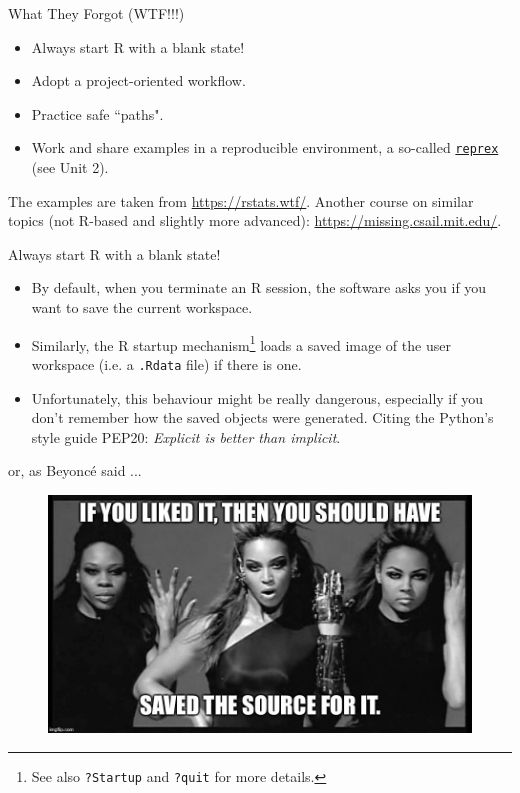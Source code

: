 \documentclass[
hyperref={bookmarks=false},
xcolor={dvipsnames,svgnames*,x11names*}, 
12pt
]{beamer}
\begin{document}
\begin{frame}{What They Forgot (WTF!!!)}
\vspace{-0.75cm}
\begin{itemize}
\itemsep 2ex
\item Always start R with a blank state!
\item Adopt a project-oriented workflow. 
\item Practice safe ``paths". 
\item Work and share examples in a reproducible environment, a so-called \href{https://reprex.tidyverse.org/}{\texttt{reprex}} (see Unit 2). 	
\end{itemize}

\vspace{0.5cm}

The examples are taken from \url{https://rstats.wtf/}. Another course on similar topics (not R-based and slightly more advanced): \url{https://missing.csail.mit.edu/}. 
\end{frame}

\begin{frame}{Always start R with a blank state!}
\vspace{-0.5cm}
\begin{itemize}
\itemsep 3ex
\item By default, when you terminate an R session, the software asks you if you want to save the current workspace. 
\item Similarly, the R startup mechanism\footnote{See also \texttt{?Startup} and \texttt{?quit} for more details.} loads a saved image of the user workspace (i.e. a \texttt{.Rdata} file) if there is one. 
\item Unfortunately, this behaviour might be really dangerous, especially if you don't remember how the saved objects were generated. Citing the Python's style guide PEP20: \textit{Explicit is better than implicit}.  
\end{itemize}
\end{frame}

\begin{frame}{or, as Beyoncé said ...}
\vspace{-0.5cm}
\begin{figure}
\centering
\includegraphics[width=\linewidth]{figures/rihanna.jpg}
\end{figure}
\end{frame}
\end{document}
